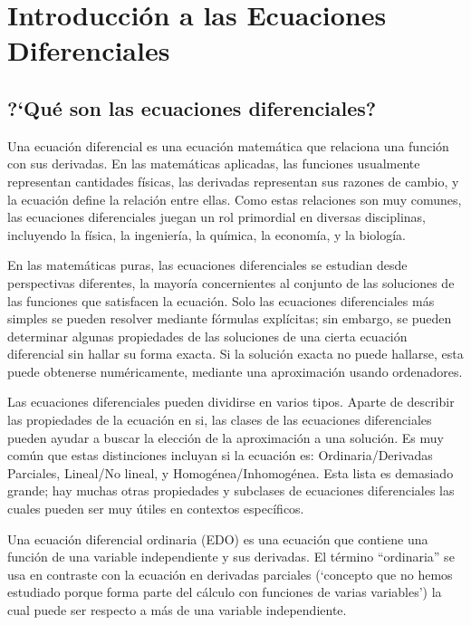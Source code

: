 \chapter{Introducción a las Ecuaciones Diferenciales}
\label{EDO}
\section{?`Qué son las ecuaciones diferenciales?}

Una ecuación diferencial es una ecuación matemática que relaciona una función con sus derivadas. En las matemáticas aplicadas, las funciones usualmente representan cantidades físicas, las derivadas representan sus razones de cambio, y la ecuación define la relación entre ellas. Como estas relaciones son muy comunes, las ecuaciones diferenciales juegan un rol primordial en diversas disciplinas, incluyendo la física, la ingeniería, la química, la economía, y la biología.

En las matemáticas puras, las ecuaciones diferenciales se estudian desde perspectivas diferentes, la mayoría concernientes al conjunto de las soluciones de las funciones que satisfacen la ecuación. Solo las ecuaciones diferenciales más simples se pueden resolver mediante fórmulas explícitas; sin embargo, se pueden determinar algunas propiedades de las soluciones de una cierta ecuación diferencial sin hallar su forma exacta. Si la solución exacta no puede hallarse, esta puede obtenerse numéricamente, mediante una aproximación usando ordenadores. 

Las ecuaciones diferenciales pueden dividirse en varios tipos. Aparte de describir las propiedades de la ecuación en si, las clases de las ecuaciones diferenciales pueden ayudar a buscar la elección de la aproximación a una solución. Es muy común que estas distinciones incluyan si la ecuación es: Ordinaria/Derivadas Parciales, Lineal/No lineal, y Homogénea/Inhomogénea. Esta lista es demasiado grande; hay muchas otras propiedades y subclases de ecuaciones diferenciales las cuales pueden ser muy útiles en contextos específicos.

Una ecuación diferencial ordinaria (EDO) es una ecuación que contiene una función de una variable independiente y sus derivadas. El término ``ordinaria'' se usa en contraste con la ecuación en derivadas parciales (`concepto que no hemos estudiado porque forma parte del cálculo con funciones de varias variables') la cual puede ser respecto a más de una variable independiente.

